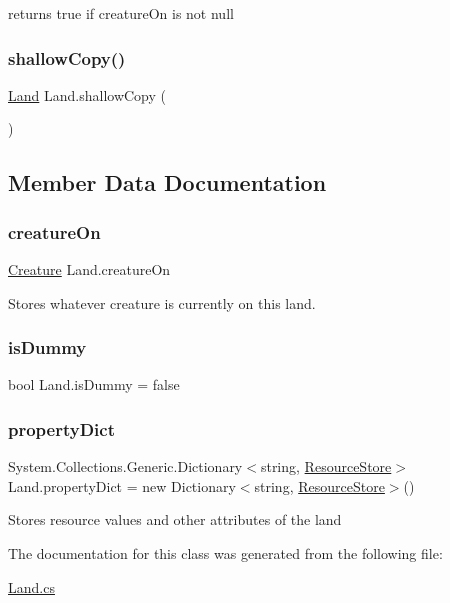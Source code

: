 returns true if creature\+On is not null 

\mbox{\label{class_land_a39ae866c981982746dd04515bbab8238}} 
\subsubsection{\texorpdfstring{shallow\+Copy()}{shallowCopy()}}
{\footnotesize\ttfamily \mbox{\hyperlink{class_land}{Land}} Land.\+shallow\+Copy (\begin{DoxyParamCaption}{ }\end{DoxyParamCaption})}



\subsection{Member Data Documentation}
\mbox{\label{class_land_a3cab3cf218bd21e41181b908bd76a053}} 
\subsubsection{\texorpdfstring{creature\+On}{creatureOn}}
{\footnotesize\ttfamily \mbox{\hyperlink{class_creature}{Creature}} Land.\+creature\+On}



Stores whatever creature is currently on this land. 

\mbox{\label{class_land_a309b7300b5d1bcdfec0fd7db41a94cc3}} 
\subsubsection{\texorpdfstring{is\+Dummy}{isDummy}}
{\footnotesize\ttfamily bool Land.\+is\+Dummy = false}

\mbox{\label{class_land_adcbc195ca2ec38fb30d0ef5e2fde4397}} 
\subsubsection{\texorpdfstring{property\+Dict}{propertyDict}}
{\footnotesize\ttfamily System.\+Collections.\+Generic.\+Dictionary$<$string, \mbox{\hyperlink{class_resource_store}{Resource\+Store}}$>$ Land.\+property\+Dict = new Dictionary$<$string, \mbox{\hyperlink{class_resource_store}{Resource\+Store}}$>$()}



Stores resource values and other attributes of the land 



The documentation for this class was generated from the following file\+:\begin{DoxyCompactItemize}
\item 
\mbox{\hyperlink{_land_8cs}{Land.\+cs}}\end{DoxyCompactItemize}
